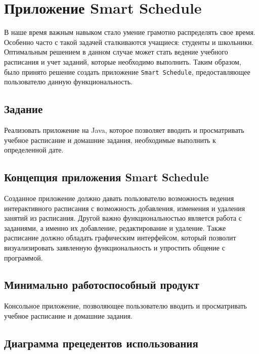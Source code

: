 


\tableofcontents
\newpage



\section{Приложение Smart Schedule}

В наше время важным навыком стало умение грамотно распределять свое время. Особенно часто с такой задачей сталкиваются учащиеся: студенты и школьники. Оптимальным решением в данном случае может стать ведение учебного расписания и учет заданий, которые необходимо выполнить. Таким образом, было принято решение создать приложение \texttt{Smart Schedule}, предоставляющее пользователю данную функциональность.

\subsection{Задание}

Реализовать приложение на Java, которое позволяет вводить и просматривать учебное расписание и домашние задания, необходимые выполнить к определенной дате.

\subsection{Концепция приложения Smart Schedule}

Созданное приложение должно давать пользователю возможность ведения интерактивного расписания с возможность добавления, изменения и удаления занятий из расписания. Другой важно функциональностью является работа с заданиями, а именно их добавление, редактирование и удаление. Также расписание должно обладать графическим интерфейсом, который позволит визуализировать заявленную функциональность и упростить общение с программой.

\subsection{Минимально работоспособный продукт}

Консольное приложение, позволяющее пользователю вводить и просматривать учебное расписание и домашние задания.

\subsection{Диаграмма прецедентов использования}


